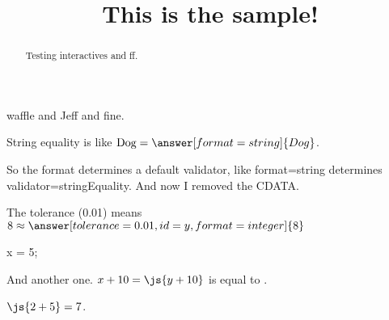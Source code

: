 \documentclass{ximera}
\title{This is the sample!}
\begin{document}
\begin{abstract}
Testing interactives and ff.
\end{abstract}

\maketitle

waffle and Jeff and fine.


\begin{problem}
  String equality is like $\mbox{Dog} = \answer[format=string]{Dog}$.

  So the format determines a default validator, like format=string determines validator=stringEquality.  And now I removed the CDATA.
\end{problem}

\begin{problem}
  The tolerance (0.01) means $8 \approx \answer[tolerance=0.01,id=y,format=integer]{8}$
  
  \begin{feedback}[72]
  \end{feedback}
\end{problem}

\begin{javascript}
x = 5;
\end{javascript}

And another one.  $x + 10 = \js{y+10}$ is equal to .

$\js{2+5} = 7$.
\end{document}
